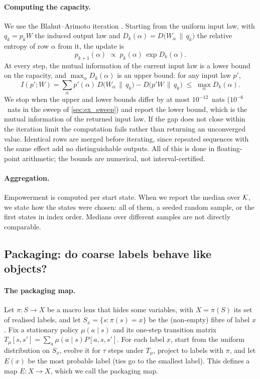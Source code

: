 \paragraph{Computing the capacity.}
We use the Blahut--Arimoto iteration \citep{blahut1972,arimoto1972}. Starting from the uniform input law, with $q_k = p_k W$ the induced output law and $D_k(\alpha)=D\bigl(W_\alpha \,\|\, q_k\bigr)$ the relative entropy of row $\alpha$ from it, the update is
\[
p_{k+1}(\alpha) \;\propto\; p_k(\alpha)\, \exp D_k(\alpha).
\]
At every step, the mutual information of the current input law is a lower bound on the capacity, and $\max_\alpha D_k(\alpha)$ is an upper bound: for any input law $p'$,
\[
I(p';W) = \sum_\alpha p'(\alpha)\, D\bigl(W_\alpha\,\|\,q_k\bigr) - D\bigl(p'W\,\|\,q_k\bigr) \;\le\; \max_\alpha D_k(\alpha).
\]
We stop when the upper and lower bounds differ by at most $10^{-12}$~nats ($10^{-6}$~nats in the sweep of \cref{sec:ex_sweep}) and report the lower bound, which is the mutual information of the returned input law. If the gap does not close within the iteration limit the computation fails rather than returning an unconverged value. Identical rows are merged before iterating, since repeated sequences with the same effect add no distinguishable outputs. All of this is done in floating-point arithmetic; the bounds are numerical, not interval-certified.

\paragraph{Aggregation.}
Empowerment is computed per start state. When we report the median over $\mathcal{K}$, we state how the states were chosen: all of them, a seeded random sample, or the first states in index order. Medians over different samples are not directly comparable.

\subsection{Packaging: do coarse labels behave like objects?}
\paragraph{The packaging map.}
Let $\pi:S\to X$ be a macro lens that hides some variables, with $X=\pi(S)$ its set of realised labels, and let $S_x=\{s:\pi(s)=x\}$ be the (non-empty) fibre of label $x$. Fix a stationary policy $\mu(a\mid s)$ and its one-step transition matrix $T_\mu[s,s']=\sum_a \mu(a\mid s)P[a,s,s']$. For each label $x$, start from the uniform distribution on $S_x$, evolve it for $\tau$ steps under $T_\mu$, project to labels with $\pi$, and let $E(x)$ be the most probable label (ties go to the smallest label). This defines a map $E:X\to X$, which we call the packaging map.

